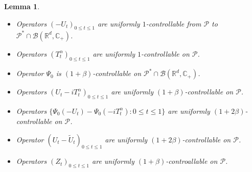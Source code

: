 \documentclass[12pt,oneside,english]{amsart}
\theoremstyle{plain}
\newtheorem{lem}[thm]{Lemma}
\theoremstyle{definition}
\numberwithin{equation}{section}
\begin{document}
\begin{lem}
\label{lem: upper bound for usgx}
$~$
\begin{itemize}
\item[(1)]
    Operators $(-U_t)_{0\leq t\leq 1}$ are uniformly $1$-controllable from $\mathcal P$ to $\mathcal P^*\cap \mathcal B(\mathbb R^d, \mathbb C_+)$.
\item[(2)]
    Operators $(T^\alpha_t)_{0\leq t\leq 1}$ are uniformly $1$-controllable on $\mathcal P$.
\item[(3)]
    Operator $\Psi_0$ is $(1+\beta)$-controllable on $\mathcal P^* \cap \mathcal B(\mathbb R^d, \mathbb C_+)$.
\item[(4)]
    Operators $(U_t- iT_t^{\alpha})_{0\leq t\leq 1}$ are uniformly $(1+\beta)$-controllable on $\mathcal P$.
\item[(5)]
    Operators $\{\Psi_0(-U_t) - \Psi_0(-iT_t^\alpha): 0\leq t\leq 1\}$ are uniformly $(1+2\beta)$-controllable on $\mathcal P$.
\item[(6)]
    Operator $(U_t-\tilde U_t)_{0\leq t\leq 1}$ are uniformly $(1+2\beta)$-controllable on $\mathcal P$.
\item[(7)]
    Operators $(Z_t)_{0\leq t\leq 1}$ are uniformly $(1+\beta)$-controallable on $\mathcal P$.
\end{itemize}
\end{lem}
\end{document}
